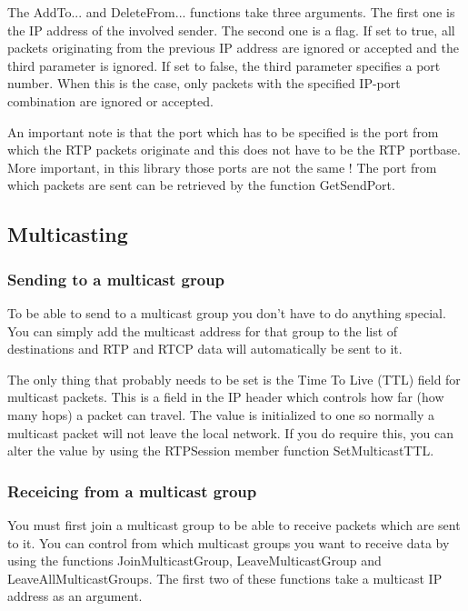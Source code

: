 The AddTo... and DeleteFrom... functions take three arguments. The first one
is the IP address of the involved sender. The second one is a flag. If set to
true, all packets originating from the previous IP address are ignored or
accepted and the third parameter is ignored. If set to false, the third
parameter specifies a port number. When this is the case, only packets with
the specified IP-port combination are ignored or accepted.
    
    
    An important note is that the port which has to be specified is the
port from which the RTP packets originate and this does not have to be the RTP
portbase. More important, in this library those ports are not the same ! The
port from which packets are sent can be retrieved by the function GetSendPort.

\subsection{Multicasting}

\subsubsection{Sending to a multicast group}

To be able to send to a multicast group you don't have to do anything special.
You can simply add the multicast address for that group to the list of
destinations and RTP and RTCP data will automatically be sent to it.
    
    
    The only thing that probably needs to be set is the Time To Live (TTL)
field for multicast packets. This is a field in the IP header which controls
how far (how many hops) a packet can travel. The value is initialized to one
so normally a multicast packet will not leave the local network. If you do
require this, you can alter the value by using the RTPSession member function
SetMulticastTTL.

\subsubsection{Receicing from a multicast group}

You must first join a multicast group to be able to receive packets which are
sent to it. You can control from which multicast groups you want to receive
data by using the functions JoinMulticastGroup, LeaveMulticastGroup and
LeaveAllMulticastGroups. The first two of these functions take a multicast
IP address as an argument.

